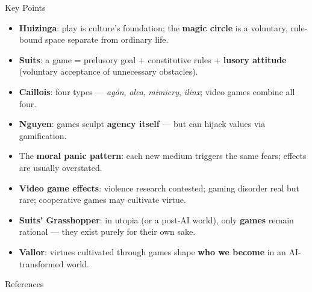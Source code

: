 \documentclass[aspectratio=169,11pt]{beamer}
\begin{document}
\begin{frame}[t]{Key Points}
\begin{conceptbox}
\scriptsize
\begin{itemize}
    \item \textbf{Huizinga}: play is culture's foundation; the \textbf{magic circle} is a voluntary, rule-bound space separate from ordinary life.
    \item \textbf{Suits}: a game = prelusory goal + constitutive rules + \textbf{lusory attitude} (voluntary acceptance of unnecessary obstacles).
    \item \textbf{Caillois}: four types --- \emph{agôn}, \emph{alea}, \emph{mimicry}, \emph{ilinx}; video games combine all four.
    \item \textbf{Nguyen}: games sculpt \textbf{agency itself} --- but can hijack values via gamification.
    \item The \textbf{moral panic pattern}: each new medium triggers the same fears; effects are usually overstated.
    \item \textbf{Video game effects}: violence research contested; gaming disorder real but rare; cooperative games may cultivate virtue.
    \item \textbf{Suits' Grasshopper}: in utopia (or a post-AI world), only \textbf{games} remain rational --- they exist purely for their own sake.
    \item \textbf{Vallor}: virtues cultivated through games shape \textbf{who we become} in an AI-transformed world.
\end{itemize}
\end{conceptbox}
\end{frame}

\begin{frame}[allowframebreaks]{References}
\printbibliography[heading=none]
\end{frame}
\end{document}
